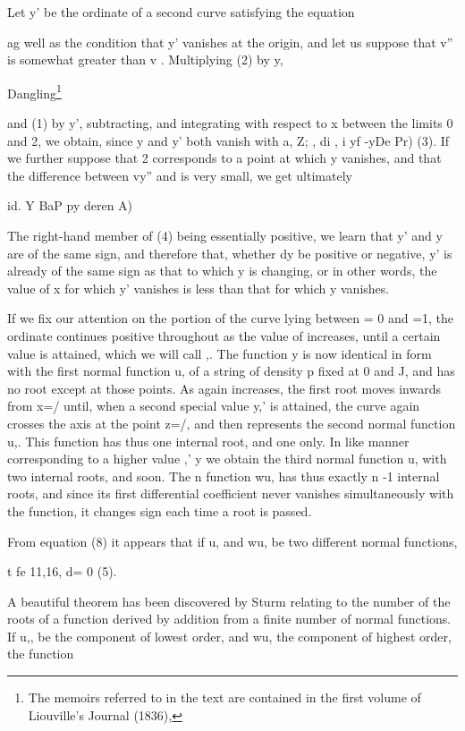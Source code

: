 Let y' be the ordinate of a second curve satisfying the equation

ag well as the condition that y' vanishes at the origin, and let us
suppose that v'' is somewhat greater than v . Multiplying (2) by y,

Dangling\footnote{ The memoirs referred to in the text are contained in the first volume
of Liouville's Journal (1836),}

and (1) by y', subtracting, and integrating with respect to x between
the limits 0 and 2, we obtain, since y and y' both vanish with a, Z; ,
di , i yf -yDe Pr) (3). If we further suppose that 2 corresponds to a
point at which y vanishes, and that the difference between vy'' and is
very small, we get ultimately

id. Y BaP py deren A)

The right-hand member of (4) being essentially positive,
we learn that y' and y are of the same sign, and therefore that,
whether dy be positive or negative, y' is already of the same sign
as that to which y is changing, or in other words, the value of x for
which y' vanishes is less than that for which y vanishes.

If we fix our attention on the portion of the curve lying between = 0
and =1, the ordinate continues positive throughout as the value of
increases, until a certain value is attained, which we will call ,. The
function y is now identical in form with the first normal function u, of
a string of density p fixed at 0 and J, and has no root except at those
points. As again increases, the first root moves inwards from x=/ until,
when a second special value y,' is attained, the curve again crosses the
axis at the point z=/, and then represents the second normal function
u,. This function has thus one internal root, and one only. In like
manner corresponding to a higher value ,' y we obtain the third normal
function u, with two internal roots, and soon. The n function wu, has
thus exactly n -1 internal roots, and since its first differential
coefficient never vanishes simultaneously with the function, it changes
sign each time a root is passed.

From equation (8) it appears that if u, and wu, be two different normal
functions,

t fe 11,16, d= 0 (5).

A beautiful theorem has been discovered by Sturm relating to the number
of the roots of a function derived by addition from a finite number of
normal functions. If u,, be the component of lowest order, and wu, the
component of highest order, the function

